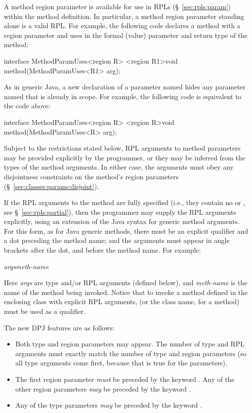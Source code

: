  A method region parameter is
available for use in RPLs (\S~\ref{sec:rpls:param}) within the method
definition.  In particular, a method region parameter standing alone
is a valid RPL.  For example, the following code declares a method
 with a region parameter  and uses  in the
formal (value) parameter and return type of the method:
%
\begin{dpjlisting}
interface MethodParamUses<region R> {
  <region R1>void method(MethodParamUses<R1> arg);
}
\end{dpjlisting}
%
As in generic Java, a new declaration of a parameter named 
hides any parameter named  that is already in scope.  For
example, the following code is equivalent to the code above:
%
\begin{dpjlisting}
interface MethodParamUses<region R> {
  <region R>void method(MethodParamUses<R> arg);
}
\end{dpjlisting}
%

 Subject to
the restrictions stated below, RPL arguments to method parameters may
be provided explicitly by the programmer, or they may be inferred from
the types of the method arguments.  In either case, the arguments must
obey any disjointness constraints on the method's region parameters
(\S~\ref{sec:classes:params:disjoint}).

 If the RPL arguments
to the method are fully specified (i.e., they contain no \kwd{*} or
, see \S~\ref{sec:rpls:partial}), then the programmer may
supply the RPL arguments explicitly, using an extension of the Java
syntax for generic method arguments.  For this form, as for Java
generic methods, there must be an explicit qualifier and a dot
preceding the method name; and the arguments must appear in angle
brackets after the dot, and before the method name.  For example:
%
\begin{description}
\item {}\emph{args}\kwd{>}\emph{meth-name}\kwd{()}
\end{description}
%
Here \emph{args} are type and/or RPL arguments (defined below), and
\emph{meth-name} is the name of the method being invoked.  Notice that
to invoke a method defined in the enclosing class with explicit RPL
arguments,  (or the class name, for a  method)
must be used as a qualifier.

The new DPJ features are as follows:
%
\begin{itemize}
%
\item Both type and region parameters may appear.  The number of type
  and RPL arguments must exactly match the number of type and region
  parameters (so all type arguments come first, because that is true
  for the parameters).
%
\item The first region parameter \emph{must} be preceded by the
  keyword .  Any of the other region parameters \emph{may}
  be preceded by the keyword .
%
\item Any of the type parameters \emph{may} be preceded by the keyword
  .
%
\end{itemize}
%

